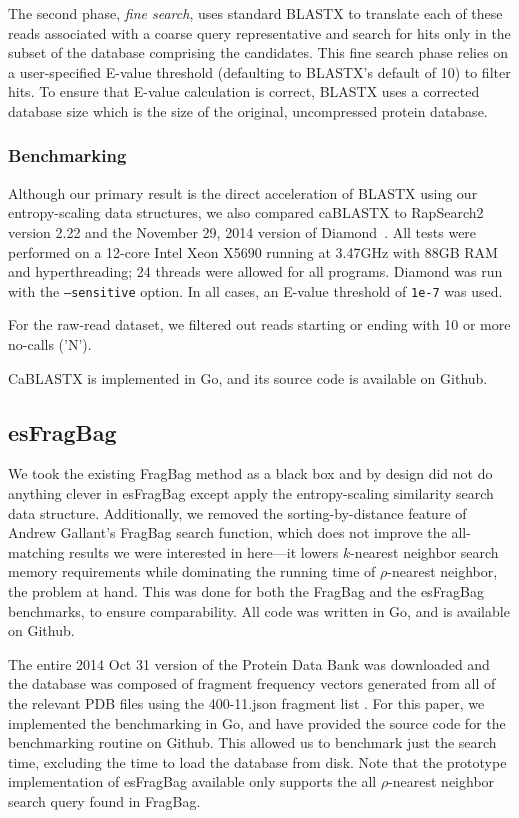 \documentclass[review,preprint,12pt]{elsarticle}
\renewcommand{\cite}{\citep} %
\theoremstyle{definition}
\theoremstyle{remark}
\begin{document}
The second phase, \emph{fine search}, uses standard BLASTX to translate each
of these reads associated with a coarse query representative and search for
hits only in the subset of the database comprising the candidates.
This fine search phase relies on a user-specified E-value threshold (defaulting
to BLASTX's default of 10) to filter hits.
To ensure that E-value calculation is correct, BLASTX uses a corrected database
size which is the size of the original, uncompressed protein database.

\subsubsection{Benchmarking}

Although our primary result is the direct acceleration of BLASTX using our
entropy-scaling data structures, we also compared caBLASTX to 
RapSearch2~\cite{zhao2012rapsearch2} version 2.22 and the November 29, 2014 
version of Diamond~\cite{buchfink2014fast}.
All tests were performed on a 12-core Intel Xeon X5690 running at 3.47GHz with
88GB RAM and hyperthreading; 24 threads were allowed for all programs.
Diamond was run with the \texttt{--sensitive} option.
In all cases, an E-value threshold of \texttt{1e-7} was used.

For the raw-read dataset, we filtered out reads starting or ending with 10 or 
more no-calls ('N').

CaBLASTX is implemented in Go, and its source code is available on Github.

\subsection{esFragBag}
We took the existing FragBag method as a black box and by design did not do anything clever in esFragBag except apply the entropy-scaling similarity search data structure.
Additionally, we removed the sorting-by-distance feature of Andrew Gallant's 
FragBag search function, which does not improve the all-matching results we 
were interested in here---it lowers $k$-nearest neighbor search memory 
requirements while dominating the running time of $\rho$-nearest neighbor, the 
problem at hand.
This was done for both the FragBag and the esFragBag benchmarks, to ensure comparability.
All code was written in Go, and is available on Github.

The entire 2014 Oct 31 version of the Protein Data Bank was downloaded and the 
database was composed of fragment frequency vectors generated from all of the 
relevant PDB files using the 400-11.json fragment list \cite{budowski2010fragbag}.
For this paper, we implemented the benchmarking in Go, and have provided the 
source code for the benchmarking routine on Github.
This allowed us to benchmark just the search time, excluding the time to load the database from disk.
Note that the prototype implementation of esFragBag available only supports the 
all $\rho$-nearest neighbor search query found in FragBag.


%

\end{document}
